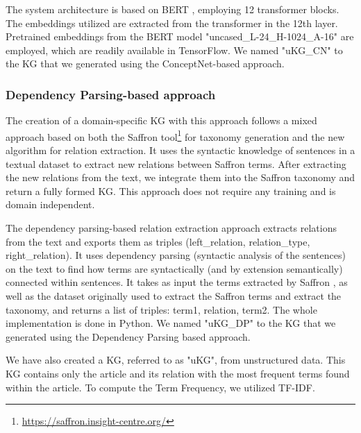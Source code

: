 \documentclass[11pt]{article}
\begin{document}
The system architecture is based on BERT \cite{DBLP:conf/naacl/DevlinCLT19}, employing 12 transformer blocks. The embeddings utilized are extracted from the transformer in the 12th layer. Pretrained embeddings from the BERT model "uncased\_L-24\_H-1024\_A-16" are employed, which are readily available in TensorFlow. We named "uKG\_CN" to the KG that we generated using the ConceptNet-based approach.

\subsubsection{Dependency Parsing-based approach}
The creation of a domain-specific KG with this approach follows a mixed approach based on both the Saffron tool\footnote{\url{https://saffron.insight-centre.org/}} for taxonomy generation and the new algorithm for relation extraction. It uses the syntactic knowledge of sentences in a textual dataset to extract new relations between Saffron terms. After extracting the new relations from the text, we integrate them into the Saffron taxonomy and return a fully formed KG. This approach does not require any training and is domain independent.

The dependency parsing-based relation extraction approach extracts relations from the text and exports them as triples (left\_relation, relation\_type, right\_relation). It uses dependency parsing (syntactic analysis of the sentences) on the text to find how terms are syntactically (and by extension semantically) connected within sentences. It takes as input the terms extracted by Saffron \citep{Pereira2019}, as well as the dataset originally used to extract the Saffron terms and extract the taxonomy, and returns a list of triples: {term1, relation, term2}. The whole implementation is done in Python. We named "uKG\_DP" to the KG that we generated using the Dependency Parsing based approach.

We have also created a KG, referred to as "uKG", from unstructured data. This KG contains only the article and its relation with the most frequent terms found within the article. To compute the Term Frequency, we utilized TF-IDF.
\end{document}

